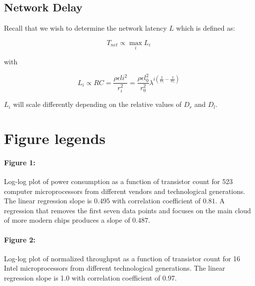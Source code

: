 \documentclass[12pt]{article}
\begin{document}
\subsection{Network Delay}

Recall that we wish to determine the network latency $L$ which is defined as:

\begin{equation}
  T_{net} \propto \max_{i} L_i
\end{equation}

\noindent with

\begin{equation}
  L_i \propto RC = \frac{\rho \epsilon li^2}{r_i^2} = \frac{\rho \epsilon
  l_0^2}{r_0^2} \lambda^{i\left(\frac{2}{D_l} - \frac{2}{D_r}\right)}
\end{equation}

\noindent $L_i$ will scale differently depending on the relative values of
$D_r$ and $D_l$. 

\begin{caseof}

  

\end{caseof}





\newpage

\section*{Figure legends}
\paragraph{Figure 1:} Log-log plot of power consumption as a function 
of transistor count for 523 computer microprocessors from different 
vendors and technological generations.  The linear regression slope is 
$0.495$ with correlation coefficient of $0.81$. A regression that 
removes the first seven data points and focuses on the main cloud of 
more modern chips produces a slope of $0.487$.

\paragraph{Figure 2:} Log-log plot of normalized throughput as a 
function of transistor count for 16 Intel microprocessors from 
different technological generations.  The linear regression slope is 
1.0 with correlation coefficient of 0.97.
\end{document}
